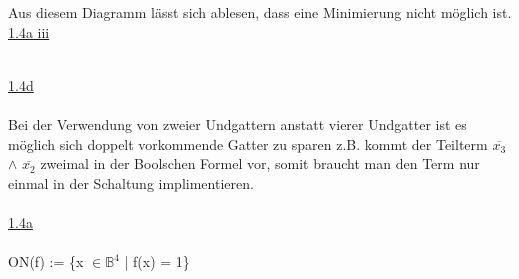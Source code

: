 \documentclass[a4paper,10pt]{scrartcl}
\begin{document}
\\\\
Aus diesem Diagramm lässt sich ablesen, dass eine Minimierung nicht möglich ist.
\newpage
\noindent
\underline{1.4a iii}\\\\
\underline{1.4d}\\\\
Bei der Verwendung von zweier Undgattern anstatt vierer Undgatter ist es möglich sich doppelt vorkommende Gatter zu sparen z.B. kommt der Teilterm $\overline{x_{3}}$ $\land$ $\overline{x_{2}}$ zweimal in der Boolschen Formel vor, somit braucht man den Term nur einmal in der Schaltung implimentieren.\\\\
\underline{1.4a}\\\\
ON(f) := \{x $\in\mathbb{B}^4$ | f(x) = 1\}\\
\end{document}
